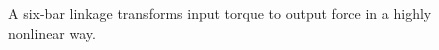 \documentclass[journal]{IEEEtran}
\begin{document}
%

\begin{figure}[!t]
	\centering
	\hfil
	\caption{A six-bar linkage transforms input torque to output force in a highly nonlinear way.}
	\label{intro_sixbar}
\end{figure}
\end{document}
